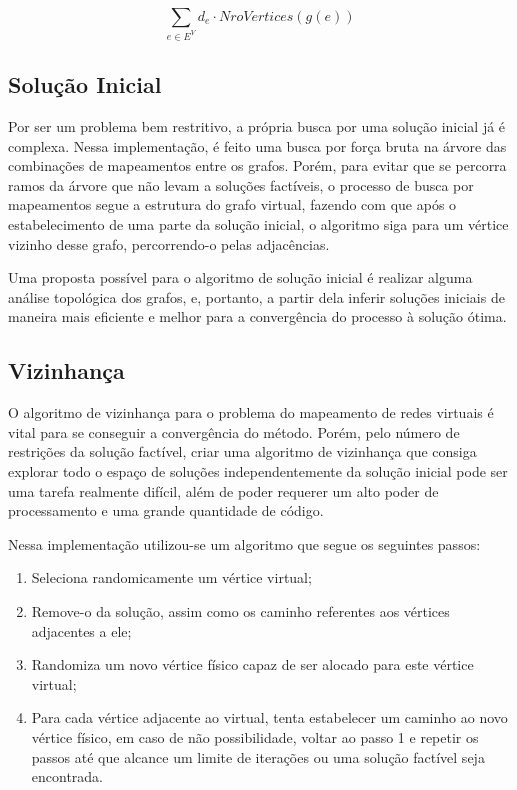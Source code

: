 \documentclass{article}
\begin{document}
\begin{displaymath}
\sum_{e \in E^{V}} d_{e} \cdot NroVertices(g(e))
\end{displaymath}

\subsection{Solução Inicial}
Por ser um problema bem restritivo, a própria busca por uma solução inicial já é complexa. Nessa implementação, é feito uma busca por força bruta na árvore das combinações de mapeamentos entre os grafos. Porém, para evitar que se percorra ramos da árvore que não levam a soluções factíveis, o processo de busca por mapeamentos segue a estrutura do grafo virtual, fazendo com que após o estabelecimento de uma parte da solução inicial, o algoritmo siga para um vértice vizinho desse grafo, percorrendo-o pelas adjacências.

Uma proposta possível para o algoritmo de solução inicial é realizar alguma análise topológica dos grafos, e, portanto, a partir dela inferir soluções iniciais de maneira mais eficiente e melhor para a convergência do processo à solução ótima.

\subsection{Vizinhança}
O algoritmo de vizinhança para o problema do mapeamento de redes virtuais é vital para se conseguir a convergência do método. Porém, pelo número de restrições da solução factível, criar uma algoritmo de vizinhança que consiga explorar todo o espaço de soluções independentemente da solução inicial pode ser uma tarefa realmente difícil, além de poder requerer um alto poder de processamento e uma grande quantidade de código.

Nessa implementação utilizou-se um algoritmo que segue os seguintes passos:
\begin{enumerate}
\item Seleciona randomicamente um vértice virtual;
\item Remove-o da solução, assim como os caminho referentes aos vértices adjacentes a ele;
\item Randomiza um novo vértice físico capaz de ser alocado para este vértice virtual;
\item Para cada vértice adjacente ao virtual, tenta estabelecer um caminho ao novo vértice físico, em caso de não possibilidade, voltar ao passo 1 e repetir os passos até que alcance um limite de iterações ou uma solução factível seja encontrada.
\end{enumerate}
\end{document}
